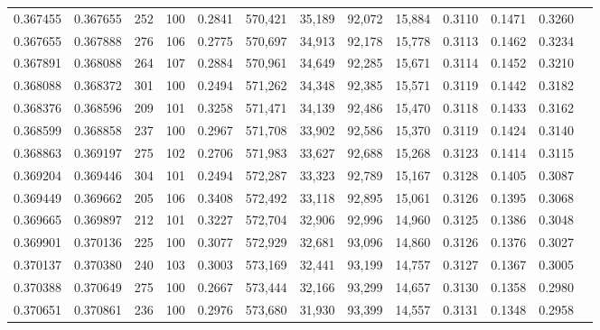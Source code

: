 \begin{tabular}{rrrrrrrrrrrrr}
0.367455 & 0.367655 &   252 & 100 &                                     0.2841 & 570,421 &  35,189 &  92,072 &  15,884 & 0.3110 & 0.1471 & 0.3260 \\
0.367655 & 0.367888 &   276 & 106 &                                     0.2775 & 570,697 &  34,913 &  92,178 &  15,778 & 0.3113 & 0.1462 & 0.3234 \\
0.367891 & 0.368088 &   264 & 107 &                                     0.2884 & 570,961 &  34,649 &  92,285 &  15,671 & 0.3114 & 0.1452 & 0.3210 \\
0.368088 & 0.368372 &   301 & 100 &                                     0.2494 & 571,262 &  34,348 &  92,385 &  15,571 & 0.3119 & 0.1442 & 0.3182 \\
0.368376 & 0.368596 &   209 & 101 &                                     0.3258 & 571,471 &  34,139 &  92,486 &  15,470 & 0.3118 & 0.1433 & 0.3162 \\
0.368599 & 0.368858 &   237 & 100 &                                     0.2967 & 571,708 &  33,902 &  92,586 &  15,370 & 0.3119 & 0.1424 & 0.3140 \\
0.368863 & 0.369197 &   275 & 102 &                                     0.2706 & 571,983 &  33,627 &  92,688 &  15,268 & 0.3123 & 0.1414 & 0.3115 \\
0.369204 & 0.369446 &   304 & 101 &                                     0.2494 & 572,287 &  33,323 &  92,789 &  15,167 & 0.3128 & 0.1405 & 0.3087 \\
0.369449 & 0.369662 &   205 & 106 &                                     0.3408 & 572,492 &  33,118 &  92,895 &  15,061 & 0.3126 & 0.1395 & 0.3068 \\
0.369665 & 0.369897 &   212 & 101 &                                     0.3227 & 572,704 &  32,906 &  92,996 &  14,960 & 0.3125 & 0.1386 & 0.3048 \\
0.369901 & 0.370136 &   225 & 100 &                                     0.3077 & 572,929 &  32,681 &  93,096 &  14,860 & 0.3126 & 0.1376 & 0.3027 \\
0.370137 & 0.370380 &   240 & 103 &                                     0.3003 & 573,169 &  32,441 &  93,199 &  14,757 & 0.3127 & 0.1367 & 0.3005 \\
0.370388 & 0.370649 &   275 & 100 &                                     0.2667 & 573,444 &  32,166 &  93,299 &  14,657 & 0.3130 & 0.1358 & 0.2980 \\
0.370651 & 0.370861 &   236 & 100 &                                     0.2976 & 573,680 &  31,930 &  93,399 &  14,557 & 0.3131 & 0.1348 & 0.2958 \\

\end{tabular}
